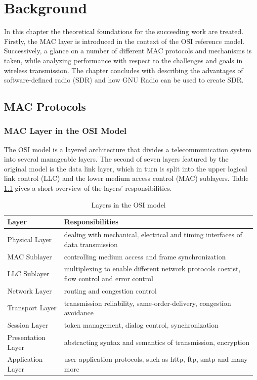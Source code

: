 \chapter{Background}

In this chapter the theoretical foundations for the succeeding work are treated. Firstly, the MAC layer is introduced in the context of the OSI reference model. Successively, a glance on a number of different MAC protocols and mechanisms is taken, while analyzing performance with respect to the challenges and goals in wireless transmission. The chapter concludes with describing the advantages of software-defined radio (SDR) and how GNU Radio can be used to create SDR.

\section{MAC Protocols}

\subsection{MAC Layer in the OSI Model}

The OSI model is a layered architecture that divides a telecommunication system into several manageable layers. The second of seven layers featured by the original model is the data link layer, which in turn is split into the upper logical link control (LLC) and the lower medium access control (MAC) sublayers. Table \ref{tab:osi-layers} gives a short overview of the layers' responsibilities. 

\begin{table}[b]
	\begin{center}
		\begin{tabular}{p{3.5cm}p{10cm}}
			\toprule
				Layer & Responsibilities \\
			\midrule
				Physical Layer & dealing with mechanical, electrical and timing interfaces of data transmission  \\
				MAC Sublayer & controlling medium access and frame synchronization \\
				LLC Sublayer & multiplexing to enable different network protocols coexist, flow control and error control \\
				Network Layer & routing and congestion control \\
				Transport Layer & transmission reliability, same-order-delivery, congestion avoidance  \\
				Session Layer & token management, dialog control, synchronization \\
				Presentation Layer & abstracting syntax and semantics of transmission, encryption \\
				Application Layer & user application protocols, such as http, ftp, smtp and many more \\
			\bottomrule
		\end{tabular}\caption{Layers in the OSI model} \label{tab:osi-layers}
	\end{center}
\end{table}

